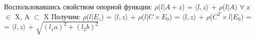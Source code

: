 \documentclass[14pt,a4paper]{article}
\begin{document}
\begin{flushleft}
{		 }
		 \newline
		 \newline
		 {\hspace*{-2cm} \large Воспользовавшись свойством опорной функции:}
		\newline
		\newline
		{\hspace*{-1cm}\Large  $\rho$($l$|$A + z$) = $\langle l, z \rangle$ + $\rho$($l$|$A$) \quad $\forall$ z $\in$ X, A $\subset$ X  }
		\newline
		\newline
		{\hspace*{-2cm} \large Получим:}
		\newline
		\newline
		{\hspace*{-1cm}\Large  {$\rho$($l$|$E_z$) = $\langle l, z \rangle$ + $\rho$($l$|$C\times E_0$) = $\langle l, z \rangle$ +  $\rho$($C^T \times l$|$E_0$) =} 
		\newline\hspace*{-1cm} {= $\langle l, z \rangle$ + $\sqrt{(l_1a)^2 + (l_2b)^2}$}  }
	\end{flushleft}
\end{document}
